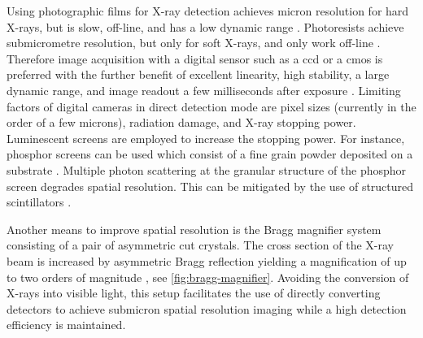 \documentclass[
twoside,
openright,
titlepage,
numbers=noenddot,
headinclude,
fleqn,
a4paper,
footinclude=true,
cleardoublepage=empty,
abstractoff,
BCOR=5mm,
paper=a4,
fontsize=11pt,
british,ngerman,american,
]{scrreprt}
\begin{document}
Using photographic films for X-ray detection achieves micron
resolution for hard X-rays, but is slow, off-line, and has a low
dynamic range \cite{Koch1998}.  Photoresists achieve submicrometre
resolution, but only for soft X-rays, and only work off-line
\cite{Koch1998}.  Therefore image acquisition with a digital sensor
such as a \ac{ccd} or a \ac{cmos} is preferred with the further
benefit of excellent linearity, high stability, a large dynamic range,
and image readout a few milliseconds after exposure \cite{Tate1997}.
Limiting factors of digital cameras in direct detection mode are pixel
sizes (currently in the order of a few microns), radiation damage, and
X-ray stopping power.  Luminescent screens are employed to increase
the stopping power.  For instance, phosphor screens can be used which
consist of a fine grain powder deposited on a substrate
\cite{Gruner2002}.  Multiple photon scattering at the granular
structure of the phosphor screen degrades spatial resolution.  This
can be mitigated by the use of structured scintillators
\cite{Martin2006}.

Another means to improve spatial resolution is the Bragg magnifier
system consisting of a pair of asymmetric cut crystals.  The cross
section of the X-ray beam is increased by asymmetric Bragg reflection
yielding a magnification of up to two orders of magnitude
\cite{Stampanoni2002,Schaefer2003}, see \cref{fig:bragg-magnifier}.
Avoiding the conversion of X-rays into visible light, this setup
facilitates the use of directly converting detectors to achieve
submicron spatial resolution imaging while a high detection efficiency
is maintained.
\end{document}
